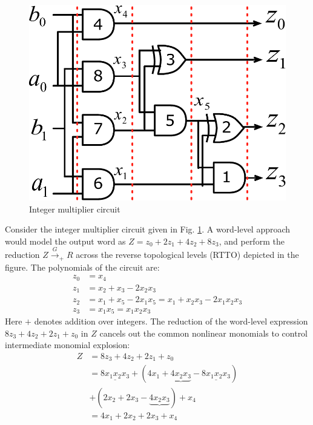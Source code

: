 \begin{figure}[hbt]
\centering
\includegraphics[scale=0.4]{figures/2-bit-mult_flipped.pdf}
\caption{Integer multiplier circuit}
\label{intmult}
\end{figure}
Consider the integer multiplier circuit given in
  Fig. \ref{intmult}. A 
word-level approach would model the output word as 
$Z = z_0 + 2z_1 + 4 z_2 + 8 z_3$, and perform the reduction
$Z\xrightarrow{G}_+R$ across the reverse topological levels (RTTO) 
depicted in the figure. The polynomials of the circuit are:
\begin{align*}
z_0 &= x_4 \\ 
z_1 &= x_2 + x_3 - 2x_2x_3\\
z_2 &= x_1 + x_5 - 2 x_1 x_5 
    = x_1 + x_2x_3 - 2x_1x_2x_3\\
z_3 &= x_1x_5 = x_1x_2x_3
\end{align*}
Here $+$ denotes addition over integers. The reduction
of the word-level expression $8z_3 + 4z_2+2z_1+z_0$ in $Z$ cancels out the
common nonlinear monomials to control intermediate monomial explosion:
\begin{align*}
Z &= 8z_3 + 4z_2+2z_1+z_0\\
  &=\underline{8x_1x_2x_3} + (4x_1 + \underbrace{4x_2x_3} -
  \underline{8x_1x_2x_3})\\
  & + (2x_2+2x_3-\underbrace{4x_2x_3}_{}) + x_4\\
  &=4x_1 + 2x_2 + 2x_3 + x_4
\end{align*}
